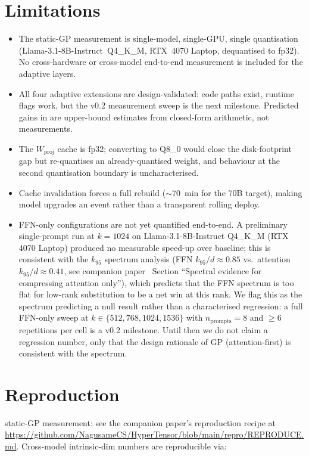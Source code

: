 \documentclass[11pt]{article}
\begin{document}
\section{Limitations}
\label{sec:limits}
\begin{itemize}
\item The static-GP measurement is single-model, single-GPU, single
quantisation (Llama-3.1-8B-Instruct~Q4\_K\_M, RTX~4070 Laptop, dequantised
to fp32).  No cross-hardware or cross-model end-to-end measurement is
included for the adaptive layers.
\item All four adaptive extensions are design-validated: code paths
exist, runtime flags work, but the v0.2 measurement sweep is the next
milestone.  Predicted gains in 
are upper-bound estimates from closed-form arithmetic, not measurements.
\item The $W_\text{proj}$ cache is fp32; converting to Q8\_0
\cite{ggerganov2023kquants} would close the disk-footprint gap but
re-quantises an already-quantised weight, and behaviour at the second
quantisation boundary is uncharacterised.
\item Cache invalidation forces a full rebuild ($\sim 70$~min for the 70B
target), making model upgrades an event rather than a transparent rolling
deploy.
\item FFN-only configurations are not yet quantified end-to-end.
A preliminary single-prompt run at $k{=}1024$ on Llama-3.1-8B-Instruct
Q4\_K\_M (RTX 4070 Laptop) produced no measurable speed-up over
baseline; this is consistent with the $k_{95}$ spectrum analysis (FFN
$k_{95}/d{\approx}0.85$ vs.\ attention $k_{95}/d{\approx}0.41$, see
companion paper~\cite{stewart2026grc} Section ``Spectral evidence for
compressing attention only''), which predicts that the FFN spectrum is
too flat for low-rank substitution to be a net win at this rank. We
flag this as the spectrum predicting a null result rather than a
characterised regression: a full FFN-only sweep at
$k\in\{512, 768, 1024, 1536\}$ with $n_\text{prompts}{=}8$ and
$\geq 6$ repetitions per cell is a v0.2 milestone. Until then we do
not claim a regression number, only that the design rationale of GP
(attention-first) is consistent with the spectrum.
\end{itemize}

\section{Reproduction}
\label{sec:repro}
static-GP measurement: see the companion paper's reproduction recipe
at \url{https://github.com/NagusameCS/HyperTensor/blob/main/repro/REPRODUCE.md}.
Cross-model intrinsic-dim numbers are reproducible via:
\end{document}
